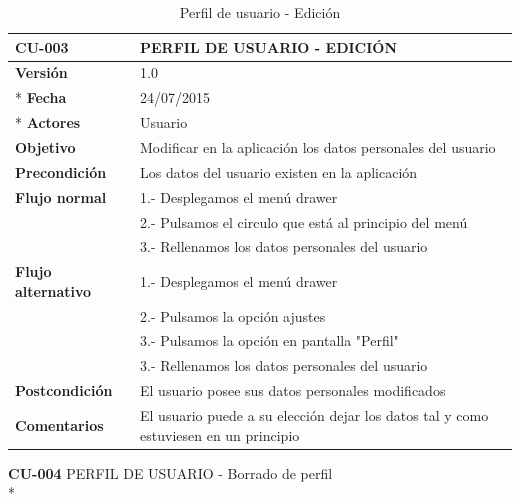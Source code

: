 \documentclass[../pfc.tex]{subfiles}
\begin{document}
	\begin{table}[H]
		\centering
		\begin{tabular}[t]{|p{3cm}|p{9.5cm}|}
			\hline \textbf{CU-003} & \textbf{PERFIL DE USUARIO - EDICIÓN} \\*
			\hline\hline \textbf{Versión} & 1.0 \\ *
			\hline\hline \textbf{Fecha} & 24/07/2015 \\ *
			\hline\textbf{Actores} 	& Usuario\\*
			\hline \textbf{Objetivo} & Modificar en la aplicación los datos personales del usuario\\* 			
			\hline \textbf{Precondición} & Los datos del usuario existen en la aplicación \\* 
			\hline \textbf{Flujo normal} & 1.- Desplegamos el menú drawer \\* 
			& 2.- Pulsamos el circulo que está al principio del menú \\*	
			& 3.- Rellenamos los datos personales del usuario\\*	
			\hline \textbf{Flujo alternativo} & 1.- Desplegamos el menú drawer \\* 
			& 2.- Pulsamos la opción ajustes \\*	
			& 3.- Pulsamos la opción en pantalla "Perfil" \\*	
			& 3.- Rellenamos los datos personales del usuario \\*	
			\hline \textbf{Postcondición} & El usuario posee sus datos personales modificados\\* 
			\hline \textbf{Comentarios}   & El usuario puede a su elección dejar los datos tal y como estuviesen en un principio\\*
			\hline
		\end{tabular}
		\caption{Perfil de usuario - Edición}
		\label{tabla:caso003}

	\end{table}
	

	






		
	\textbf{CU-004}	PERFIL DE USUARIO - Borrado de perfil\\*
\end{document}
